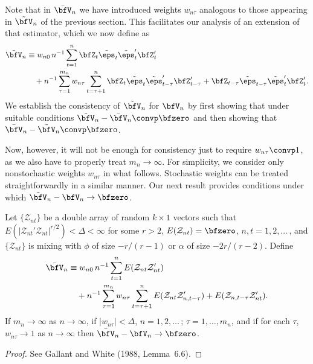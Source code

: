 Note that in $\bar{\bfV}_n$ we have introduced weights $w_{n\tau}$ analogous to those appearing in $\tilde{\bfV}_n$ of the previous section. This facilitates our analysis of an extension of that estimator, which we now define as
\begin{align*}
  \tilde{\bfV}_n &\equiv w_{n0}\, n^{-1}\sum_{t=1}^{n}\bfZ_t\tilde{\eps}_t\tilde{\eps}_t'\bfZ_t' \\
    &\quad + n^{-1}\sum_{\tau=1}^{m_n}w_{n\tau}\sum_{t=\tau+1}^{n}\bfZ_t\tilde{\eps}_t\tilde{\eps}_{t-\tau}'\bfZ_{t-\tau}' + \bfZ_{t-\tau}\tilde{\eps}_{t-\tau}\tilde{\eps}_t'\bfZ_t'.
\end{align*}
We establish the consistency of $\tilde{\bfV}_n$ for $\bfV_n$ by first showing that under suitable conditions $\tilde{\bfV}_n - \bar{\bfV}_n \convp \bfzero$ and then showing that $\bar{\bfV}_n - \tilde{\bfV}_n \convp \bfzero$.

Now, however, it will not be enough for consistency just to require $w_{n\tau} \convp 1$, as we also have to properly treat $m_n \to \infty$. For simplicity, we consider only nonstochastic weights $w_{n\tau}$ in what follows. Stochastic weights can be treated straightforwardly in a similar manner. Our next result provides conditions under which $\tilde{\bfV}_n - \bfV_n \to \bfzero$.

\begin{lemma}\label{lem:6.18}
Let $\{\mathcal{Z}_{nt}\}$ be a double array of random $k \times 1$ vectors such that $E(|\mathcal{Z}_{nt}'\mathcal{Z}_{nt}|^{r/2}) < \Delta < \infty$ for some $r > 2$, $E(\mathcal{Z}_{nt}) = \bfzero$, $n, t = 1,2,\ldots$\,, and $\{\mathcal{Z}_{nt}\}$ is mixing with $\phi$ of size $-r/(r-1)$ or $\alpha$ of size $-2r/(r-2)$. Define
\begin{align*}
  \bar{\bfV}_n &\equiv w_{n0}\, n^{-1}\sum_{t=1}^{n}E(\mathcal{Z}_{nt}\mathcal{Z}_{nt}') \\
    &\quad + n^{-1}\sum_{\tau=1}^{m_n}w_{n\tau}\sum_{t=\tau+1}^{n}E(\mathcal{Z}_{nt}\mathcal{Z}_{n,t-\tau}') + E(\mathcal{Z}_{n,t-\tau}\mathcal{Z}_{nt}').
\end{align*}
If $m_n \to \infty$ as $n \to \infty$, if $|w_{n\tau}| < \Delta$, $n = 1,2,\ldots$\,; $\tau = 1,\ldots,m_n$, and if for each $\tau$, $w_{n\tau} \to 1$ as $n \to \infty$ then $\bar{\bfV}_n - \bfV_n \to \bfzero$.
\end{lemma}

\begin{proof}
See Gallant and White (1988, Lemma~6.6).
\end{proof}

